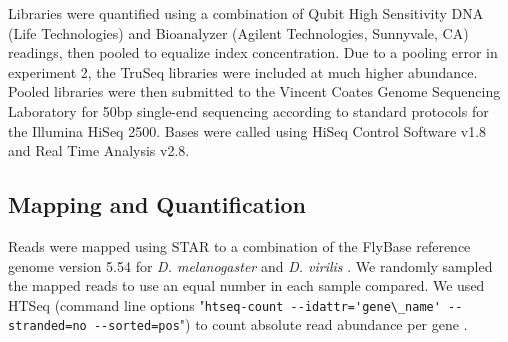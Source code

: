 Libraries were quantified using a combination of Qubit High Sensitivity DNA (Life Technologies) and Bioanalyzer (Agilent Technologies, Sunnyvale, CA) readings, then pooled to equalize index concentration. Due to a pooling error in experiment 2, the TruSeq libraries were included at much higher abundance. Pooled libraries were then submitted to the Vincent Coates Genome Sequencing Laboratory for 50bp single-end sequencing according to standard protocols for the Illumina HiSeq 2500. Bases were called using HiSeq Control Software v1.8 and Real Time Analysis v2.8.


\subsection{Mapping and Quantification}


Reads were mapped using STAR \cite{Dobin:2012fg} to a combination of the FlyBase reference genome version 5.54 for {\em D. melanogaster} and {\em D. virilis} \cite{McQuilton:2011iq}. We randomly sampled the mapped reads to use an equal number in each sample compared. We used HTSeq (command line options "\verb|htseq-count --idattr='gene\_name' --stranded=no --sorted=pos|") to count absolute read abundance per gene \cite{Anders_2014}.
